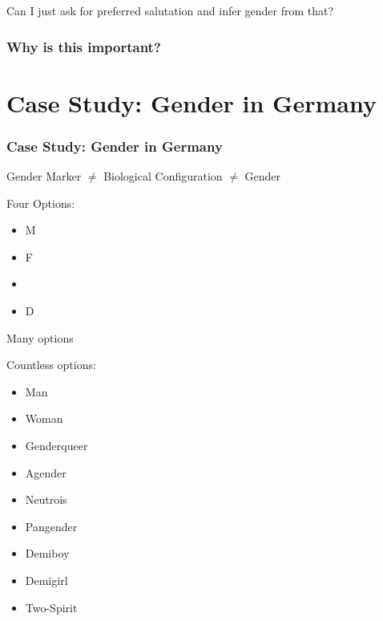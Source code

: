 \documentclass[aspectratio=169,x11names]{beamer}
\begin{document}
\begin{frame}
\begin{center}
\huge
Can I just ask for preferred salutation and infer gender from that?
\end{center}
\end{frame}

\begin{frame}
\frametitle{Why is this important?}
\end{frame}

\section*{Case Study: Gender in Germany}

\begin{frame}
\frametitle{Case Study: Gender in Germany}

\vspace*{15px}

\begin{center}
Gender Marker \hfill $\neq$ \hfill Biological Configuration \hfill $\neq$ \hfill Gender \hspace*{30px}
\end{center}

\vspace*{50px}

\begin{minipage}{0.333\textwidth}
Four Options:\medskip

\begin{itemize}
\item M
\item F
\item
\item D 
\end{itemize}
\end{minipage}%
\begin{minipage}{0.333\textwidth}
Many options
\end{minipage}%
\begin{minipage}{0.333\textwidth}
\begin{center}
Countless options:
\begin{itemize}
\item Man
\item Woman
\item Genderqueer
\item Agender
\item Neutrois
\item Pangender
\item Demiboy
\item Demigirl
\item Two-Spirit
\end{itemize}
\end{center}
\end{minipage}

\end{frame}
\end{document}
